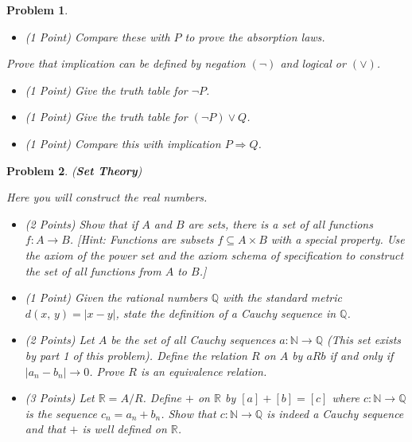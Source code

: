 \documentclass{article}
\theoremstyle{normal}
\newtheorem{problem}{Problem}
\begin{document}
\begin{problem}
\begin{itemize}
            \item (1 Point) Compare these with $P$ to prove the absorption laws.
        \end{itemize}
        Prove that implication can be defined by
        \textit{negation} $(\neg)$ and \textit{logical or} $(\lor)$.
        \begin{itemize}
            \item (1 Point) Give the truth table for $\neg{P}$.
            \item (1 Point) Give the truth table for $(\neg{P})\lor{Q}$.
            \item (1 Point) Compare this with implication $P\Rightarrow{Q}$.
        \end{itemize}
    \end{problem}
    \clearpage
    \begin{problem}
        (\textbf{Set Theory})
        \par\hfill\par
        Here you will construct the real numbers.
        \begin{itemize}
            \item (2 Points) Show that if $A$ and $B$ are sets, there is a set
                of all functions $f:A\rightarrow{B}$. [Hint: Functions are
                subsets $f\subseteq{A}\times{B}$ with a special property.
                Use the axiom of the power set and the axiom schema of
                specification to construct the set of all functions
                from $A$ to $B$.]
            \item (1 Point) Given the rational numbers $\mathbb{Q}$ with the
                standard metric $d(x,\,y)=|x-y|$, state the definition of a
                Cauchy sequence in $\mathbb{Q}$.
            \item (2 Points) Let $A$ be the set of all Cauchy sequences
                $a:\mathbb{N}\rightarrow\mathbb{Q}$ (This set exists by part 1
                of this problem). Define the relation $R$
                on $A$ by $aRb$ if and only if $|a_{n}-b_{n}|\rightarrow{0}$.
                Prove $R$ is an equivalence relation.
            \item (3 Points) Let $\mathbb{R}=A/R$. Define $+$ on $\mathbb{R}$
                by $[a]+[b]=[c]$ where $c:\mathbb{N}\rightarrow\mathbb{Q}$ is
                the sequence $c_{n}=a_{n}+b_{n}$. Show that
                $c:\mathbb{N}\rightarrow\mathbb{Q}$ is indeed a Cauchy sequence
                and that $+$ is well defined on $\mathbb{R}$.
        \end{itemize}
    \end{problem}
\end{document}

